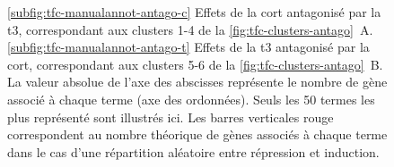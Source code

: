 \begin{figure}[!htbp]
{\ref{subfig:tfc-manualannot-antago-c} Effets de la \gls{cort} antagonisé par la \gls{t3}, correspondant aux clusters 1-4 de la \autoref{fig:tfc-clusters-antago}~A.
\ref{subfig:tfc-manualannot-antago-t} Effets de la \gls{t3} antagonisé par la \gls{cort}, correspondant aux clusters 5-6 de la \autoref{fig:tfc-clusters-antago}~B.
La valeur absolue de l'axe des abscisses représente le nombre de gène associé à chaque terme (axe des ordonnées).
Seuls les 50 termes les plus représenté sont illustrés ici.
Les barres verticales rouge correspondent au nombre théorique de gènes associés à chaque terme dans le cas d'une répartition aléatoire entre répression et induction.
}
\label{fig:tfc-manualannot-antago}
%
\end{figure}
